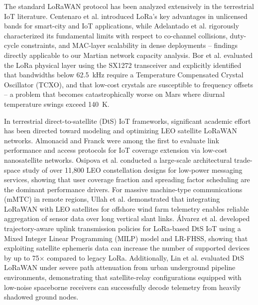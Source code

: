\documentclass{ijuc}
\begin{document}
The standard LoRaWAN protocol has been analyzed extensively in the terrestrial IoT literature. Centenaro et al. \cite{centenaro2016lora} introduced LoRa's key advantages in unlicensed bands for smart-city and IoT applications, while Adelantado et al. \cite{adelantado2017understanding} rigorously characterized its fundamental limits with respect to co-channel collisions, duty-cycle constraints, and MAC-layer scalability in dense deployments -- findings directly applicable to our Martian network capacity analysis. Bor et al. \cite{bor2016lora} evaluated the LoRa physical layer using the SX1272 transceiver and explicitly identified that bandwidths below 62.5~kHz require a Temperature Compensated Crystal Oscillator (TCXO), and that low-cost crystals are susceptible to frequency offsets -- a problem that becomes catastrophically worse on Mars where diurnal temperature swings exceed 140~K.

In terrestrial direct-to-satellite (DtS) IoT frameworks, significant academic effort has been directed toward modeling and optimizing LEO satellite LoRaWAN networks. Almonacid and Franck \cite{almonacid2017extending} were among the first to evaluate link performance and access protocols for IoT coverage extension via low-cost nanosatellite networks. Osipova et al. \cite{osipova2025architecting} conducted a large-scale architectural trade-space study of over 11,800 LEO constellation designs for low-power messaging services, showing that user coverage fraction and spreading factor scheduling are the dominant performance drivers. For massive machine-type communications (mMTC) in remote regions, Ullah et al. \cite{windfarm2022} demonstrated that integrating LoRaWAN with LEO satellites for offshore wind farm telemetry enables reliable aggregation of sensor data over long vertical slant links. \'Alvarez et al. \cite{alvarez2022uplink} developed trajectory-aware uplink transmission policies for LoRa-based DtS IoT using a Mixed Integer Linear Programming (MILP) model and LR-FHSS, showing that exploiting satellite ephemeris data can increase the number of supported devices by up to 75$\times$ compared to legacy LoRa. Additionally, Lin et al. \cite{underground2025} evaluated DtS LoRaWAN under severe path attenuation from urban underground pipeline environments, demonstrating that satellite-relay configurations equipped with low-noise spaceborne receivers can successfully decode telemetry from heavily shadowed ground nodes.
\end{document}
